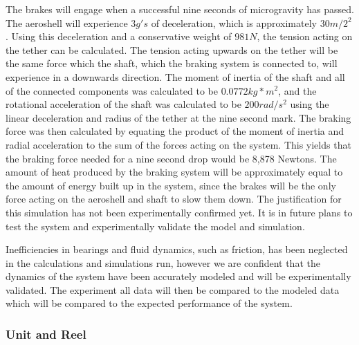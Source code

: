 The brakes will engage when a successful nine seconds of microgravity has passed. The aeroshell will experience $3 g's$ of deceleration, which is approximately $30 m/2^2$. Using this deceleration and a conservative weight of $981 N$, the tension acting on the tether can be calculated. The tension acting upwards on the tether will be the same force which the shaft, which the braking system is connected to, will experience in a downwards direction. The moment of inertia of the shaft and all of the connected components was calculated to be $0.0772 kg*m^2$, and the rotational acceleration of the shaft was calculated to be $200 rad/s^2$ using the linear deceleration and radius of the tether at the nine second mark. The braking force was then calculated by equating the product of the moment of inertia and radial acceleration to the sum of the forces acting on the system. This yields that the braking force needed for a nine second drop would be 8,878 Newtons. The amount of heat produced by the braking system will be approximately equal to the amount of energy built up in the system, since the brakes will be the only force acting on the aeroshell and shaft to slow them down. The justification for this simulation has not been experimentally confirmed yet. It is in future plans to test the system and experimentally validate the model and simulation.

Inefficiencies in bearings and fluid dynamics, such as friction, has been neglected in the calculations and simulations run, however we are confident that the dynamics of the system have been accurately modeled and will be experimentally validated. The experiment all data will then be compared to the modeled data which will be compared to the expected performance of the system.

\subsubsection{Unit and Reel} \label{UnitReelDesignAnalysis}

